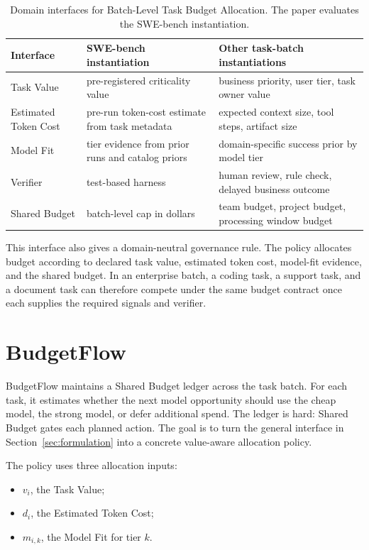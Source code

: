 \documentclass[sigconf,review,anonymous]{acmart}
\newcommand{\method}{BudgetFlow\xspace}
\newcommand{\taskvalue}{Task Value\xspace}
\newcommand{\tokencost}{Estimated Token Cost\xspace}
\newcommand{\modelfit}{Model Fit\xspace}
\newcommand{\sharedbudget}{Shared Budget\xspace}
\newcommand{\verifier}{Verifier\xspace}
\begin{document}
\begin{table}[t]
\centering
\small
\begin{tabular}{p{}p{}p{}}
\toprule
Interface & SWE-bench instantiation & Other task-batch instantiations \\
\midrule
\taskvalue & pre-registered criticality value & business priority, user tier, task owner value \\
\tokencost & pre-run token-cost estimate from task metadata & expected context size, tool steps, artifact size \\
\modelfit & tier evidence from prior runs and catalog priors & domain-specific success prior by model tier \\
\verifier & test-based harness & human review, rule check, delayed business outcome \\
\sharedbudget & batch-level cap in dollars & team budget, project budget, processing window budget \\
\bottomrule
\end{tabular}
\caption{Domain interfaces for Batch-Level Task Budget Allocation. The paper evaluates the SWE-bench instantiation.}
\label{tab:interfaces}
\vspace{0.6em}
\end{table}

This interface also gives a domain-neutral governance rule. The policy allocates budget according to declared task value, estimated token cost, model-fit evidence, and the shared budget. In an enterprise batch, a coding task, a support task, and a document task can therefore compete under the same budget contract once each supplies the required signals and verifier.

\section{BudgetFlow}
\label{sec:method}
\method maintains a \sharedbudget ledger across the task batch. For each task, it estimates whether the next model opportunity should use the cheap model, the strong model, or defer additional spend. The ledger is hard: \sharedbudget gates each planned action. The goal is to turn the general interface in Section~\ref{sec:formulation} into a concrete value-aware allocation policy.

The policy uses three allocation inputs:

\begin{itemize}
    \item $v_i$, the \taskvalue;
    \item $d_i$, the \tokencost;
    \item $m_{i,k}$, the \modelfit for tier $k$.
\end{itemize}
\end{document}
